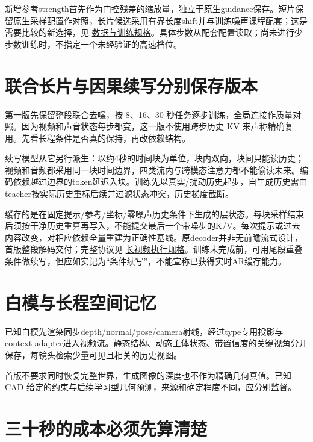 新增参考strength首先作为门控残差的缩放量，独立于原生guidance保存。短片保留原生采样配置作对照，长片候选采用有界长度shift并与训练噪声课程配套；这是需要比较的新选择，见 \hyperref[seedance-m25]{数据与训练规格}。具体步数从配套配置读取；尚未进行少步数训练时，不指定一个未经验证的高速档位。

\section{联合长片与因果续写分别保存版本}\label{seedance-m19-ux8054ux5408ux957fux7247ux4e0eux56e0ux679cux7eedux5199ux5206ux522bux4fddux5b58ux7248ux672c}

第一版先保留整段联合去噪，按 8、16、30 秒任务逐步训练，全局连接作质量对照。因为视频和声音状态每步都变，这一版不使用跨步历史 KV 来声称精确复用。先看长程条件是否真的保持，再改依赖结构。

续写模型从它另行派生：以约4秒的时间块为单位，块内双向，块间只能读历史；视频和音频都采用同一块时间边界，四类流内与跨模态注意力都不能偷读未来。编码依赖越过边界的token延迟入块。训练先以真实/扰动历史起步，自生成历史需由teacher按实际历史重标后续并过滤状态冲突，历史梯度截断。

缓存的是在固定提示/参考/坐标/零噪声历史条件下生成的层状态。每块采样结束后须按干净历史重算再写入，不能提交最后一个带噪步的K/V。每次提示或过去内容改变，对相应依赖全量重建为正确性基线。原decoder并非无前瞻流式设计，首版整段解码交付；完整协议见 \hyperref[seedance-m24]{长视频执行规格}。训练未完成前，可用尾段重叠条件做续写，但应如实记为``条件续写''，不能宣称已获得实时AR缓存能力。

\section{白模与长程空间记忆}\label{seedance-m19-ux767dux6a21ux4e0eux957fux7a0bux7a7aux95f4ux8bb0ux5fc6}

已知白模先渲染同步depth/normal/pose/camera射线，经过type专用投影与context adapter进入视频流。静态结构、动态主体状态、带置信度的关键视角分开保存，每镜头检索少量可见且相关的历史视图。

首版不要求同时恢复完整世界，生成图像的深度也不作为精确几何真值。已知 CAD 给定的约束与后续学习型几何预测，来源和确定程度不同，应分别监督。

\section{三十秒的成本必须先算清楚}\label{seedance-m19-ux4e09ux5341ux79d2ux7684ux6210ux672cux5fc5ux987bux5148ux7b97ux6e05ux695a}

